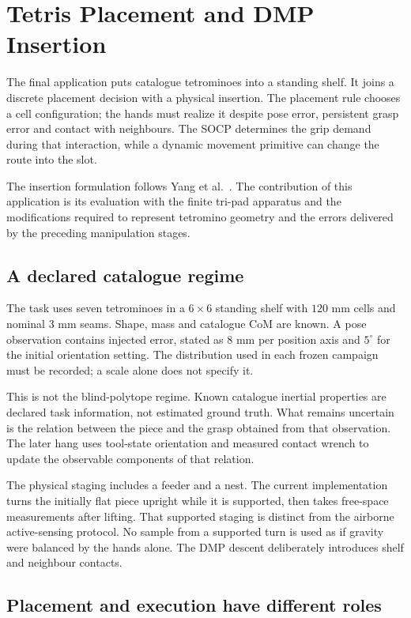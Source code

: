\chapter{Tetris Placement and DMP Insertion}
\label{ch:tetris}

The final application puts catalogue tetrominoes into a standing shelf. It joins a discrete placement decision with a physical insertion. The placement rule chooses a cell configuration; the hands must realize it despite pose error, persistent grasp error and contact with neighbours. The SOCP determines the grip demand during that interaction, while a dynamic movement primitive can change the route into the slot.

The insertion formulation follows Yang et al.~\cite{yang2025haptic}. The contribution of this application is its evaluation with the finite tri-pad apparatus and the modifications required to represent tetromino geometry and the errors delivered by the preceding manipulation stages.

\section{A declared catalogue regime}

The task uses seven tetrominoes in a $6\times6$ standing shelf with $120$ mm cells and nominal $3$ mm seams. Shape, mass and catalogue CoM are known. A pose observation contains injected error, stated as $8$ mm per position axis and $5^\circ$ for the initial orientation setting. The distribution used in each frozen campaign must be recorded; a scale alone does not specify it.

This is not the blind-polytope regime. Known catalogue inertial properties are declared task information, not estimated ground truth. What remains uncertain is the relation between the piece and the grasp obtained from that observation. The later hang uses tool-state orientation and measured contact wrench to update the observable components of that relation.

The physical staging includes a feeder and a nest. The current implementation turns the initially flat piece upright while it is supported, then takes free-space measurements after lifting. That supported staging is distinct from the airborne active-sensing protocol. No sample from a supported turn is used as if gravity were balanced by the hands alone. The DMP descent deliberately introduces shelf and neighbour contacts.

\section{Placement and execution have different roles}

